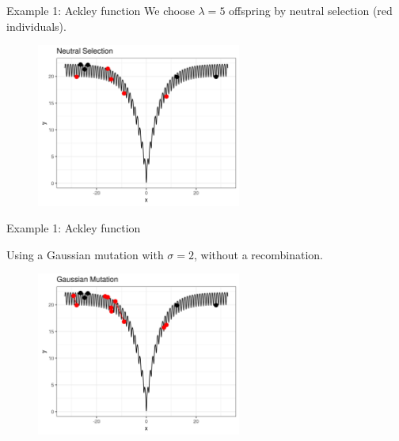 \documentclass[11pt,compress,t,notes=noshow, xcolor=table]{beamer}
\begin{document}




\begin{vbframe}{Example 1: Ackley function}
We choose $\lambda = 5$ offspring by neutral selection (red individuals).

\vspace{0.5cm}

\begin{center}
\begin{figure}
  \includegraphics[width=0.6\textwidth]{figure_man/1dim-ackley-func-neutral-selec.png}
\end{figure}
\end{center}

\end{vbframe}

\begin{vbframe}{Example 1: Ackley function}

Using a Gaussian mutation with $\sigma=2$, without a recombination.
\vspace{0.5cm}

\begin{center}
\begin{figure}
  \includegraphics[width=0.6\textwidth]{figure_man/1dim-ackley-func-gaussian-mutation.png}
\end{figure}
\end{center}

\end{vbframe}
\end{document}
